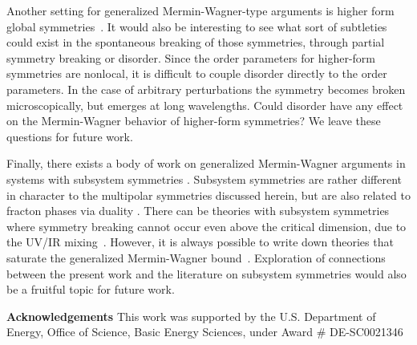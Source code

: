 \documentclass[twocolumn, longbibliography]{revtex4-2}
\begin{document}
Another setting for generalized Mermin-Wagner-type arguments is higher form global symmetries~\cite{GKSW, Lake, Marvin}. It would also be interesting to see what sort of subtleties could exist in the spontaneous breaking of those symmetries, through partial symmetry breaking or disorder. Since the order parameters for higher-form symmetries are nonlocal, it is difficult to couple disorder directly to the order parameters. In the case of arbitrary perturbations the symmetry becomes broken microscopically, but emerges at long wavelengths. Could disorder have any effect on the Mermin-Wagner behavior of higher-form symmetries? We leave these questions for future work. 

Finally, there exists a body of work on generalized Mermin-Wagner arguments in systems with subsystem symmetries \cite{Batista2005, SeibergA, SeibergB, SeibergC, Gorantla2021, Distler2021}. Subsystem symmetries are rather different in character to the multipolar symmetries discussed herein, but are also related to fracton phases via duality \cite{VHF2}. There can be theories with subsystem symmetries where symmetry breaking cannot occur even above the critical dimension, due to the UV/IR mixing~\cite{Gorantla2021}. However, it is always possible to write down theories that saturate the generalized Mermin-Wagner bound~\cite{Distler2021}.
Exploration of connections between the present work and the literature on subsystem symmetries would also be a fruitful topic for future work. 

{\bf Acknowledgements} This work was supported by
the U.S. Department of Energy, Office of Science, Basic
Energy Sciences, under Award \# DE-SC0021346


\end{document}
